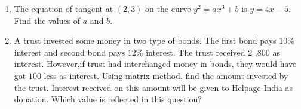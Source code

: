 \documentclass[12pt,-letter paper]{article}
\begin{document}
\begin{enumerate}
\item The equation of tangent at $(2,3)$ on the curve $y^2=ax^3+b$ is $y=4x-5$. Find the values of $a$ and $b$.            
\item A trust invested some money in two type of bonds. The first bond pays $10\%$ interest and second bond pays $12\%$ interest. The trust received \rupee $2$ ,$800$ as interest. However,if trust had interchanged money in bonds, they would have got \rupee $100$ less as interest. Using matrix method, find the amount invested by the trust. Interest received on this amount will be given to Helpage India as donation. Which value is reflected in this question?
\end{enumerate}
\end{document}
